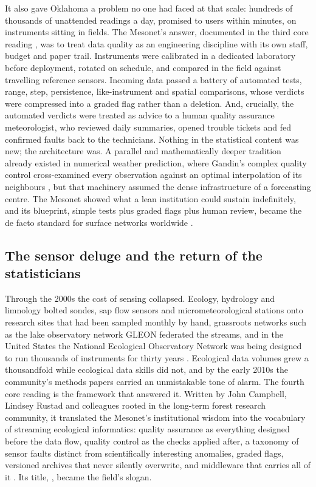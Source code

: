 It also gave Oklahoma a problem no one had faced at that scale: hundreds of
thousands of unattended readings a day, promised to users within minutes, on
instruments sitting in fields. The Mesonet's answer, documented in the third
core reading \citep{shafer2000}, was to treat data quality as an engineering
discipline with its own staff, budget and paper trail. Instruments were
calibrated in a dedicated laboratory before deployment, rotated on schedule,
and compared in the field against travelling reference sensors. Incoming data
passed a battery of automated tests, range, step, persistence,
like-instrument and spatial comparisons, whose verdicts were compressed into
a graded flag rather than a deletion. And, crucially, the automated verdicts
were treated as advice to a human quality assurance meteorologist, who
reviewed daily summaries, opened trouble tickets and fed confirmed faults
back to the technicians. Nothing in the statistical content was new; the
architecture was. A parallel and mathematically deeper tradition already
existed in numerical weather prediction, where Gandin's complex quality
control cross-examined every observation against an optimal interpolation of
its neighbours \citep{gandin1988}, but that machinery assumed the dense
infrastructure of a forecasting centre. The Mesonet showed what a lean
institution could sustain indefinitely, and its blueprint, simple tests plus
graded flags plus human review, became the de facto standard for surface
networks worldwide \citep{fiebrich2010, estevez2011}.

\subsection{The sensor deluge and the return of the statisticians}

Through the 2000s the cost of sensing collapsed. Ecology, hydrology and
limnology bolted sondes, sap flow sensors and micrometeorological stations
onto research sites that had been sampled monthly by hand, grassroots
networks such as the lake observatory network GLEON federated the streams,
and in the United States the National Ecological Observatory Network was
being designed to run thousands of instruments for thirty years
\citep{taylor2013}. Ecological data volumes grew a thousandfold while
ecological data skills did not, and by the early 2010s the community's
methods papers carried an unmistakable tone of alarm. The fourth core
reading is the framework that answered it. Written by John Campbell, Lindsey
Rustad and colleagues rooted in the long-term forest research community, it
translated the Mesonet's institutional wisdom into the vocabulary of
streaming ecological informatics: quality assurance as everything designed
before the data flow, quality control as the checks applied after, a
taxonomy of sensor faults distinct from scientifically interesting
anomalies, graded flags, versioned archives that never silently overwrite,
and middleware that carries all of it \citep{campbell2013}. Its title,
, became the field's slogan.

